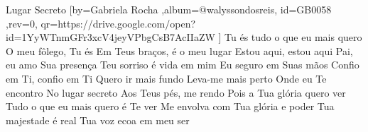 \beginsong
{Lugar Secreto %
}[by={Gabriela Rocha %
},album={@walyssondosreis},
id={GB0058 %
},rev={0}, %
qr={https://drive.google.com/open?id=1YyWTnmGFr3xcV4jeyVPbgCsB7AcIIaZW %
}]
\beginverse*
Tu és tudo o que eu mais quero
O meu fôlego, Tu és
Em Teus braços, é o meu lugar
Estou aqui, estou aqui
\endverse
\beginverse*
Pai, eu amo Sua presença
Teu sorriso é vida em mim
Eu seguro em Suas mãos
Confio em Ti, confio em Ti
\endverse
\beginchorus
Quero ir mais fundo
Leva-me mais perto
Onde eu Te encontro
No lugar secreto
Aos Teus pés, me rendo
Pois a Tua glória quero ver
\endchorus
\beginverse*
Tudo o que eu mais quero é Te ver
Me envolva com Tua glória e poder
Tua majestade é real
Tua voz ecoa em meu ser
\endverse
\vspace{4em} %
\begin{comment}
\lstset{basicstyle=\scriptsize\bf} %
\tab{Solo 1}
\begin{lstlisting}
E|-----------------------------------------------------|
B|-----------------------------------------------------|
G|-----------------------------------------------------|
D|-----------------------------------------------------|
A|-----------------------------------------------------|
E|-----------------------------------------------------|
\end{lstlisting}
\end{comment}
 
